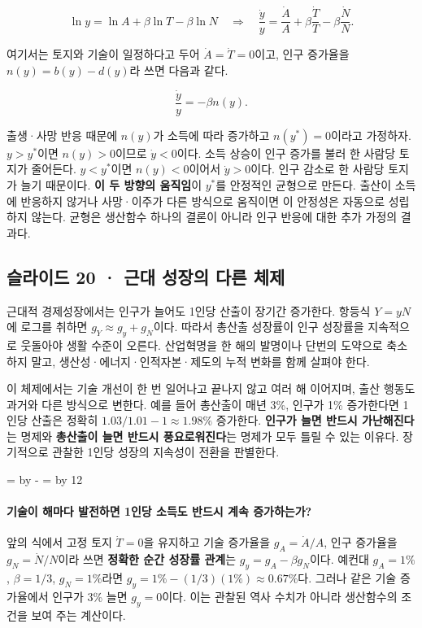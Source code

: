 \documentclass[10pt,a4paper]{article}
\newcommand{\ReserveQuestionSpace}{%
  \par\begingroup
  \dimen0=\pagegoal \advance\dimen0 by -\pagetotal
  \dimen2=\baselineskip \multiply\dimen2 by 12
  \ifdim\dimen0<\dimen2 \newpage\fi
  \endgroup}
\begin{document}
\[
\ln y=\ln A+\beta\ln T-\beta\ln N
\quad\Longrightarrow\quad
\frac{\dot y}{y}=\frac{\dot A}{A}+\beta\frac{\dot T}{T}-\beta\frac{\dot N}{N}.
\]

여기서는 토지와 기술이 일정하다고 두어 $\dot A=\dot T=0$이고, 인구 증가율을 $n(y)=b(y)-d(y)$라 쓰면 다음과 같다.\par

\[
\frac{\dot y}{y}=-\beta n(y).
\]

출생·사망 반응 때문에 $n(y)$가 소득에 따라 증가하고 $n(y^*)=0$이라고 가정하자. $y>y^*$이면 $n(y)>0$이므로 $\dot y<0$이다. 소득 상승이 인구 증가를 불러 한 사람당 토지가 줄어든다. $y<y^*$이면 $n(y)<0$이어서 $\dot y>0$이다. 인구 감소로 한 사람당 토지가 늘기 때문이다. \textbf{이 두 방향의 움직임}이 $y^*$를 안정적인 균형으로 만든다. 출산이 소득에 반응하지 않거나 사망·이주가 다른 방식으로 움직이면 이 안정성은 자동으로 성립하지 않는다. 균형은 생산함수 하나의 결론이 아니라 인구 반응에 대한 추가 가정의 결과다.\par

\subsection{슬라이드 20 · 근대 성장의 다른 체제}
근대적 경제성장에서는 인구가 늘어도 1인당 산출이 장기간 증가한다. 항등식 $Y=yN$에 로그를 취하면 $g_Y\approx g_y+g_N$이다. 따라서 총산출 성장률이 인구 성장률을 지속적으로 웃돌아야 생활 수준이 오른다. 산업혁명을 한 해의 발명이나 단번의 도약으로 축소하지 말고, 생산성·에너지·인적자본·제도의 누적 변화를 함께 살펴야 한다.\par

이 체제에서는 기술 개선이 한 번 일어나고 끝나지 않고 여러 해 이어지며, 출산 행동도 과거와 다른 방식으로 변한다. 예를 들어 총산출이 매년 3\%, 인구가 1\% 증가한다면 1인당 산출은 정확히 $1.03/1.01-1\approx1.98\%$ 증가한다. \textbf{인구가 늘면 반드시 가난해진다}는 명제와 \textbf{총산출이 늘면 반드시 풍요로워진다}는 명제가 모두 틀릴 수 있는 이유다. 장기적으로 관찰한 1인당 성장의 지속성이 전환을 판별한다.\par

\ReserveQuestionSpace
\paragraph{기술이 해마다 발전하면 1인당 소득도 반드시 계속 증가하는가?}
앞의 식에서 고정 토지 $\dot T=0$을 유지하고 기술 증가율을 $g_A=\dot A/A$, 인구 증가율을 $g_N=\dot N/N$이라 쓰면 \textbf{정확한 순간 성장률 관계}는 $g_y=g_A-\beta g_N$이다. 예컨대 $g_A=1\%$, $\beta=1/3$, $g_N=1\%$라면 $g_y=1\%-(1/3)(1\%)\approx0.67\%$다. 그러나 같은 기술 증가율에서 인구가 3\% 늘면 $g_y=0$이다. 이는 관찰된 역사 수치가 아니라 생산함수의 조건을 보여 주는 계산이다.\par
\end{document}

